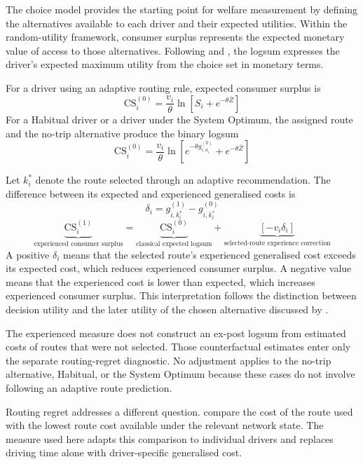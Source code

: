 \documentclass{article}
\begin{document}
The choice model provides the starting point for welfare measurement by defining the alternatives available to each driver and their expected utilities. Within the random-utility framework, consumer surplus represents the expected monetary value of access to those alternatives. Following \textcite{williams1977} and \textcite{smallRosen1981}, the logsum expresses the driver's expected maximum utility from the choice set in monetary terms.

For a driver using an adaptive routing rule, expected consumer surplus is
\[
\mathrm{CS}_i^{(0)}
=
\frac{v_i}{\theta}
\ln
\left[
S_i
+
e^{-\theta\bar Z}
\right]
\]
For a Habitual driver or a driver under the System Optimum, the assigned route and the no-trip alternative produce the binary logsum
\[
\mathrm{CS}_i^{(0)}
=
\frac{v_i}{\theta}
\ln
\left[
e^{-\theta g_{i,a_i}^{(0)}}
+
e^{-\theta\bar Z}
\right]
\]

Let $k_i^*$ denote the route selected through an adaptive recommendation. The difference between its expected and experienced generalised costs is
\[
\delta_i
=
g_{i,k_i^*}^{(1)}
-
g_{i,k_i^*}^{(0)}
\]
\[
\underbrace{\mathrm{CS}_i^{(1)}}_{\text{experienced consumer surplus}}
=
\underbrace{\mathrm{CS}_i^{(0)}}_{\text{classical expected logsum}}
+
\underbrace{\left[-v_i\delta_i\right]}_{\text{selected-route experience correction}}
\]
A positive $\delta_i$ means that the selected route's experienced generalised cost exceeds its expected cost, which reduces experienced consumer surplus. A negative value means that the experienced cost is lower than expected, which increases experienced consumer surplus. This interpretation follows the distinction between decision utility and the later utility of the chosen alternative discussed by \textcite{chorusDeJong2011}.

The experienced measure does not construct an ex-post logsum from estimated costs of routes that were not selected. Those counterfactual estimates enter only the separate routing-regret diagnostic. No adjustment applies to the no-trip alternative, Habitual, or the System Optimum because these cases do not involve following an adaptive route prediction.

Routing regret addresses a different question. \Textcite{cabannesEtAl2019} compare the cost of the route used with the lowest route cost available under the relevant network state. The measure used here adapts this comparison to individual drivers and replaces driving time alone with driver-specific generalised cost.
\end{document}
